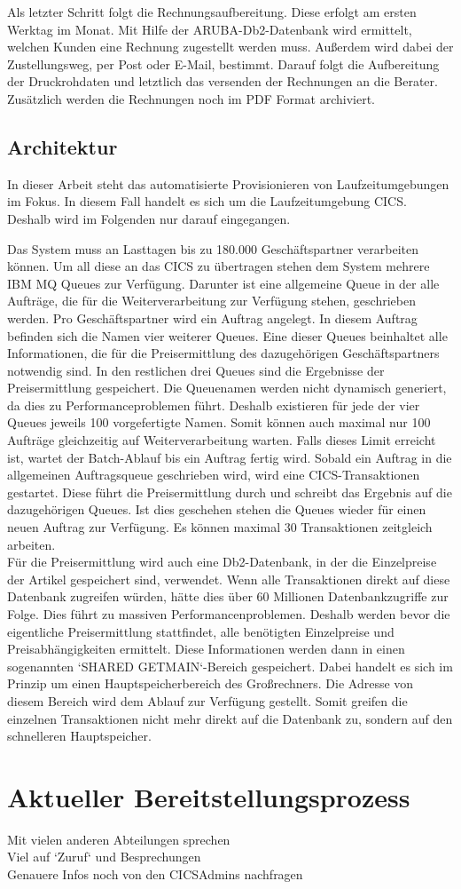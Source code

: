 Als letzter Schritt folgt die Rechnungsaufbereitung.
Diese erfolgt am ersten Werktag im Monat.
Mit Hilfe der ARUBA-Db2-Datenbank wird ermittelt, welchen Kunden eine Rechnung zugestellt werden muss.
Außerdem wird dabei der Zustellungsweg, per Post oder E-Mail, bestimmt.
Darauf folgt die Aufbereitung der Druckrohdaten und letztlich das versenden der Rechnungen an die Berater.
Zusätzlich werden die Rechnungen noch im PDF Format archiviert.

\subsection{Architektur}\label{rechArch}
In dieser Arbeit steht das automatisierte Provisionieren von Laufzeitumgebungen im Fokus.
In diesem Fall handelt es sich um die Laufzeitumgebung CICS.
Deshalb wird im Folgenden nur darauf eingegangen.

Das System muss an Lasttagen bis zu 180.000 Geschäftspartner verarbeiten können.
Um all diese an das CICS zu übertragen stehen dem System mehrere IBM MQ Queues zur Verfügung.
Darunter ist eine allgemeine Queue in der alle Aufträge, die für die Weiterverarbeitung zur Verfügung stehen, geschrieben werden.
Pro Geschäftspartner wird ein Auftrag angelegt.
In diesem Auftrag befinden sich die Namen vier weiterer Queues.
Eine dieser Queues beinhaltet alle Informationen, die für die Preisermittlung des dazugehörigen Geschäftspartners notwendig sind.
In den restlichen drei Queues sind die Ergebnisse der Preisermittlung gespeichert.
Die Queuenamen werden nicht dynamisch generiert, da dies zu Performanceproblemen führt.
Deshalb existieren für jede der vier Queues jeweils 100 vorgefertigte Namen.
Somit können auch maximal nur 100 Aufträge gleichzeitig auf Weiterverarbeitung warten.
Falls dieses Limit erreicht ist, wartet der Batch-Ablauf bis ein Auftrag fertig wird.
Sobald ein Auftrag in die allgemeinen Auftragsqueue geschrieben wird, wird eine CICS-Transaktionen gestartet.
Diese führt die Preisermittlung durch und schreibt das Ergebnis auf die dazugehörigen Queues.
Ist dies geschehen stehen die Queues wieder für einen neuen Auftrag zur Verfügung.
Es können maximal 30 Transaktionen zeitgleich arbeiten.\\
Für die Preisermittlung wird auch eine Db2-Datenbank, in der die Einzelpreise der Artikel gespeichert sind, verwendet.
Wenn alle Transaktionen direkt auf diese Datenbank zugreifen würden, hätte dies über 60 Millionen Datenbankzugriffe zur Folge.
Dies führt zu massiven Performancenproblemen.
Deshalb werden bevor die eigentliche Preisermittlung stattfindet, alle benötigten Einzelpreise und Preisabhängigkeiten ermittelt.
Diese Informationen werden dann in einen sogenannten `SHARED GETMAIN`-Bereich gespeichert.
Dabei handelt es sich im Prinzip um einen Hauptspeicherbereich des Großrechners.
Die Adresse von diesem Bereich wird dem Ablauf zur Verfügung gestellt.
Somit greifen die einzelnen Transaktionen nicht mehr direkt auf die Datenbank zu, sondern auf den schnelleren Hauptspeicher.

\section{Aktueller Bereitstellungsprozess}
Mit vielen anderen Abteilungen sprechen\\
Viel auf `Zuruf` und Besprechungen\\
Genauere Infos noch von den CICSAdmins nachfragen\\

 